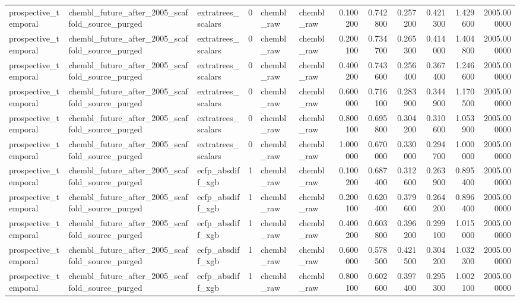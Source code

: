 \begin{longtable}{lllrllrrrrrr}
prospective\_temporal & chembl\_future\_after\_2005\_scaffold\_source\_purged & extratrees\_scalars & 0 & chembl\_raw & chembl\_raw & 0.100200 & 0.742800 & 0.257200 & 0.421300 & 1.429600 & 2005.000000 \\
prospective\_temporal & chembl\_future\_after\_2005\_scaffold\_source\_purged & extratrees\_scalars & 0 & chembl\_raw & chembl\_raw & 0.200100 & 0.734700 & 0.265300 & 0.414000 & 1.404800 & 2005.000000 \\
prospective\_temporal & chembl\_future\_after\_2005\_scaffold\_source\_purged & extratrees\_scalars & 0 & chembl\_raw & chembl\_raw & 0.400200 & 0.743600 & 0.256400 & 0.367400 & 1.246600 & 2005.000000 \\
prospective\_temporal & chembl\_future\_after\_2005\_scaffold\_source\_purged & extratrees\_scalars & 0 & chembl\_raw & chembl\_raw & 0.600000 & 0.716100 & 0.283900 & 0.344900 & 1.170500 & 2005.000000 \\
prospective\_temporal & chembl\_future\_after\_2005\_scaffold\_source\_purged & extratrees\_scalars & 0 & chembl\_raw & chembl\_raw & 0.800100 & 0.695800 & 0.304200 & 0.310600 & 1.053900 & 2005.000000 \\
prospective\_temporal & chembl\_future\_after\_2005\_scaffold\_source\_purged & extratrees\_scalars & 0 & chembl\_raw & chembl\_raw & 1.000000 & 0.670000 & 0.330000 & 0.294700 & 1.000000 & 2005.000000 \\
prospective\_temporal & chembl\_future\_after\_2005\_scaffold\_source\_purged & ecfp\_absdiff\_xgb & 1 & chembl\_raw & chembl\_raw & 0.100200 & 0.687400 & 0.312600 & 0.263900 & 0.895400 & 2005.000000 \\
prospective\_temporal & chembl\_future\_after\_2005\_scaffold\_source\_purged & ecfp\_absdiff\_xgb & 1 & chembl\_raw & chembl\_raw & 0.200100 & 0.620400 & 0.379600 & 0.264200 & 0.896400 & 2005.000000 \\
prospective\_temporal & chembl\_future\_after\_2005\_scaffold\_source\_purged & ecfp\_absdiff\_xgb & 1 & chembl\_raw & chembl\_raw & 0.400200 & 0.603800 & 0.396200 & 0.299100 & 1.015000 & 2005.000000 \\
prospective\_temporal & chembl\_future\_after\_2005\_scaffold\_source\_purged & ecfp\_absdiff\_xgb & 1 & chembl\_raw & chembl\_raw & 0.600000 & 0.578500 & 0.421500 & 0.304200 & 1.032300 & 2005.000000 \\
prospective\_temporal & chembl\_future\_after\_2005\_scaffold\_source\_purged & ecfp\_absdiff\_xgb & 1 & chembl\_raw & chembl\_raw & 0.800100 & 0.602600 & 0.397400 & 0.295300 & 1.002100 & 2005.000000 \\

\end{longtable}
